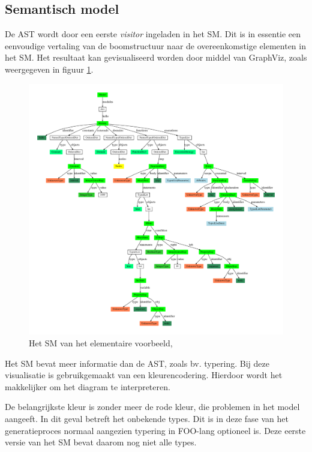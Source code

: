 
\subsection{Semantisch model}
\label{subsection:devel-semantic-model}

De AST wordt door een eerste \emph{visitor} ingeladen in het SM. Dit is in
essentie een eenvoudige vertaling van de boomstructuur naar de overeenkomstige
elementen in het SM. Het resultaat kan gevisualiseerd worden door middel van
GraphViz, zoals weergegeven in figuur \ref{fig:hello.sm}.

\begin{figure}[ht]
  \centering
  \includegraphics[width=\linewidth]{resources/hello_sm.pdf}
  \caption{Het SM van het elementaire voorbeeld, }
  \label{fig:hello.sm}
\end{figure}

Het SM bevat meer informatie dan de AST, zoals bv. typering. Bij deze
visualisatie is gebruikgemaakt van een kleurencodering. Hierdoor wordt het
makkelijker om het diagram te interpreteren.

De belangrijkste kleur is zonder meer de rode kleur, die problemen in het model
aangeeft. In dit geval betreft het onbekende types. Dit is in deze fase van het
generatieproces normaal aangezien typering in FOO-lang optioneel is. Deze
eerste versie van het SM bevat daarom nog niet alle types.


